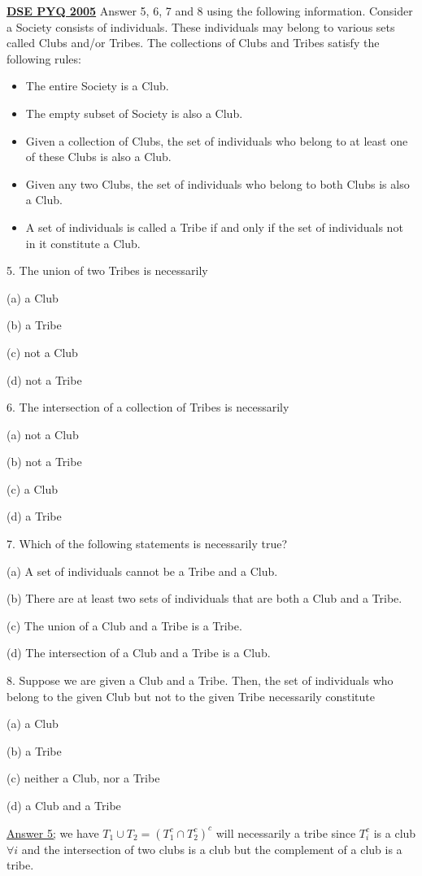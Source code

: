 \documentclass[12pt,a4paper]{article}
\begin{document}
  \underline{\textbf{DSE PYQ 2005}}
  Answer 5, 6, 7 and 8 using the following information. Consider a Society consists of individuals. These individuals may belong to various sets called Clubs and/or Tribes. The collections of Clubs and Tribes satisfy the following rules:
\begin{itemize}
    \item The entire Society is a Club.
    \item The empty subset of Society is also a Club.
    \item Given a collection of Clubs, the set of individuals who belong to at least one of these Clubs is also a Club.
    \item Given any two Clubs, the set of individuals who belong to both Clubs is also a Club.
    \item A set of individuals is called a Tribe if and only if the set of individuals not in it constitute a Club.
\end{itemize}
5. The union of two Tribes is necessarily

(a) a Club

(b) a Tribe

(c) not a Club

(d) not a Tribe

6. The intersection of a collection of Tribes is necessarily

(a) not a Club

(b) not a Tribe

(c) a Club

(d) a Tribe

7. Which of the following statements is necessarily true?

(a) A set of individuals cannot be a Tribe and a Club.

(b) There are at least two sets of individuals that are both a Club and a Tribe.

(c) The union of a Club and a Tribe is a Tribe.

(d) The intersection of a Club and a Tribe is a Club.

8. Suppose we are given a Club and a Tribe. Then, the set of individuals who belong to the given Club but not to the given Tribe necessarily constitute

(a) a Club

(b) a Tribe

(c) neither a Club, nor a Tribe

(d) a Club and a Tribe

\underline{Answer 5;}
we have \(T_{1} \cup T_{2} = \left( T_{1}^c \cap T_{2}^c \right)^c \) will necessarily a tribe since \(T_{i}^c\) is a club \(\forall i\) and the intersection of two clubs is a club but the complement of a club is a tribe.
\end{document}
